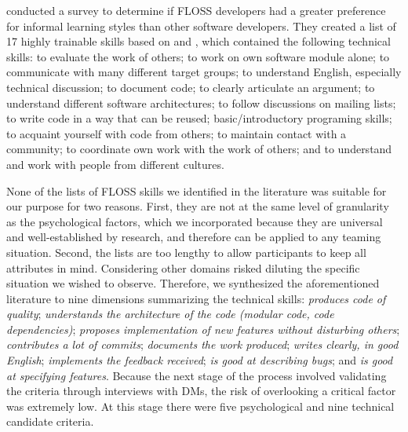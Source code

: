 \cite{barcomb:2015:developers} conducted a survey to determine if
FLOSS developers had a greater preference for informal learning
styles than other software developers. They created a list of 17
highly trainable skills based on \cite{Kimmelmann13} and
\cite{david:2007:free}, which contained the following technical skills:
to evaluate the work of others;
to work on own software module alone;
to communicate with many different target groups;
to understand English, especially technical discussion;
to document code;
to clearly articulate an argument;
to understand different software architectures;
to follow discussions on mailing lists;
to write code in a way that can be reused;
basic/introductory programing skills;
to acquaint yourself with code from others;
to maintain contact with a community;
to coordinate own work with the work of others; and
to understand and work with people from different cultures.

None of the lists of FLOSS skills we identified in the literature was suitable for our purpose for two reasons. First, they
are not at the same level of granularity as the psychological factors, which we
incorporated because they are universal and well-established by research, and therefore 
can be applied to any teaming situation. Second, the lists are too lengthy to allow participants to keep all attributes in mind. Considering other domains risked diluting the specific situation
we wished to observe. Therefore, we synthesized the aforementioned literature to nine
dimensions summarizing the technical skills:
{\em produces code of quality};
{\em understands the architecture of the code (modular code, code dependencies)};
{\em proposes implementation of new features without disturbing others};
{\em contributes a lot of commits};
{\em documents the work produced};
{\em writes clearly, in good English};
{\em implements the feedback received};
{\em is good at describing bugs}; and
{\em is good at specifying features}.
Because the next stage of the process involved validating the criteria through
interviews with DMs, the risk of overlooking a critical factor was extremely low.
At this stage there were five psychological and nine technical candidate criteria.

